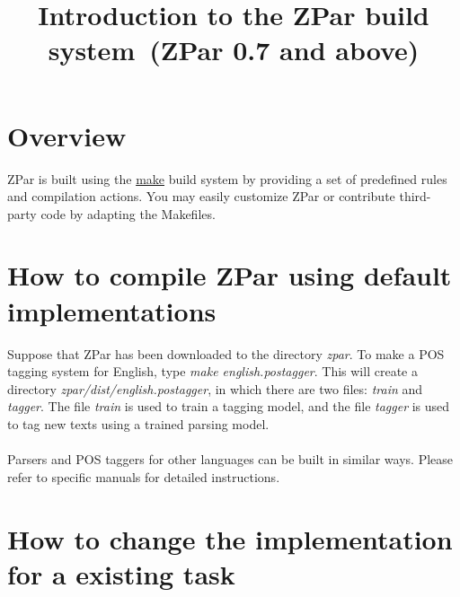 \documentclass[12pt]{article}
\title{Introduction to the ZPar build system~(ZPar 0.7 and above)}
\begin{document}
\begin{CJK}{GBK}{song}
\maketitle

\section{Overview}
\label{sec:overview}
ZPar is built using the \href{http://www.gnu.org/software/make/}{make} build system
by providing a set of predefined rules and compilation actions.
You may easily customize ZPar or contribute third-party code
by adapting the Makefiles.

\section{How to compile ZPar using default implementations}
Suppose that ZPar has been downloaded to the directory \textit{zpar}. 
To make a POS tagging system for English, 
type \textit{make english.postagger}. 
This will create a directory \textit{zpar/dist/english.postagger}, 
in which there are two files: \textit{train} and \textit{tagger}. 
The file \textit{train} is used to train a tagging model,
and the file \textit{tagger} is used to tag new texts using a trained parsing model.
\\
\\
Parsers and POS taggers for other languages can be built in similar ways.
Please refer to specific manuals for detailed instructions.

\section{How to change the implementation for a existing task}
\label{sec:how-change-impl}


\end{CJK}
\end{document}
